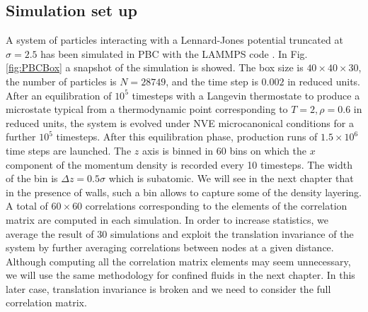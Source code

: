 \documentclass[b5paper,openright,10pt]{book}
\begin{document}
\subsection{Simulation set up}
\label{Sec:SimSetUpPBC}
A  system  of particles  interacting  with  a Lennard-Jones  potential
truncated at  $\sigma=2.5$ has been  simulated in PBC with  the LAMMPS code \cite{Plimpton1995}.
In Fig. \ref{fig:PBCBox} a snapshot of the simulation is showed.
The box  size is $40\times40\times30$, the  number of particles
is $N=28749$, and the time step is $0.002$ in reduced units.  After an
equilibration  of  $10^5$ timesteps  with  a  Langevin thermostate  to
produce a microstate typical  from a thermodynamic point corresponding
to $T=2,\rho=0.6$  in reduced units,  the system is evolved  under NVE
microcanonical conditions for a  further $10^5$ timesteps.  After this
equilibration phase,  production runs  of $1.5\times 10^6$  time steps
are launched.  The  $z$ axis is binned  in $60$ bins on  which the $x$
component of the momentum density is recorded every 10 timesteps.  The
width of the  bin is $\Delta z=0.5\sigma$ which is  subatomic.  We will see in the next chapter that in the
presence of walls,  such a bin allows to capture some of the density layering.  A total of $60\times  60$ correlations corresponding to the
elements of  the correlation matrix  are computed in  each simulation.
In  order  to increase  statistics,  we  average  the result  of  $30$
simulations and  exploit the  translation invariance  of the  system by
further  averaging correlations  between  nodes at  a given  distance.
Although  computing  all  the  correlation matrix  elements  may  seem
unnecessary, we will  use the same methodology for  confined fluids in
the next chapter. In this later case, translation invariance is
broken and we need to consider the full correlation matrix.
\end{document}
